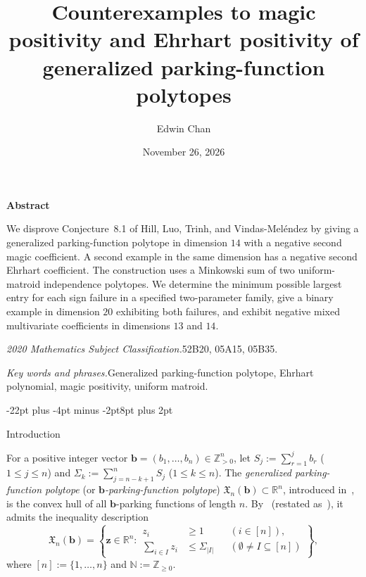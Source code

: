 \documentclass[11pt,letterpaper]{article}
\makeatletter
\renewcommand{\section}{\@startsection{section}{1}{\z@}%
  {-22pt plus -4pt minus -2pt}{8pt plus 2pt}%
  {\normalfont\fontsize{14}{17}\selectfont\bfseries\raggedright}}
\renewenvironment{abstract}{%
  \par\noindent\textbf{Abstract}\par\nobreak\vskip4pt
  \noindent\ignorespaces
}{\par}
\theoremstyle{result}
\theoremstyle{remark}
\newcommand{\NN}{\mathbb{N}}
\newcommand{\ZZ}{\mathbb{Z}}
\newcommand{\RR}{\mathbb{R}}
\newcommand{\X}{\mathfrak{X}}
\newcommand{\vb}{\mathbf{b}}
\makeatother
\begin{document}
\title{Counterexamples to magic positivity and Ehrhart positivity of generalized parking-function polytopes}
\author{Edwin Chan}
\date{November 26, 2026}

\maketitle

\begin{abstract}
We disprove Conjecture~8.1 of Hill, Luo, Trinh, and Vindas-Mel\'endez by giving a generalized parking-function polytope in dimension $14$ with a negative second magic coefficient. A second example in the same dimension has a negative second Ehrhart coefficient. The construction uses a Minkowski sum of two uniform-matroid independence polytopes. We determine the minimum possible largest entry for each sign failure in a specified two-parameter family, give a binary example in dimension $20$ exhibiting both failures, and exhibit negative mixed multivariate coefficients in dimensions $13$ and $14$.
\end{abstract}

\smallskip
{\small\noindent\textit{2020 Mathematics Subject Classification.}\enspace 52B20, 05A15, 05B35.
\par\noindent\textit{Key words and phrases.}\enspace Generalized parking-function polytope, Ehrhart polynomial, magic positivity, uniform matroid.\par}

\section{Introduction}
\label{sec:intro}

For a positive integer vector $\vb=(b_1,\dots,b_n)\in\ZZ_{>0}^n$, let $S_j:=\sum_{r=1}^j b_r$ ($1\le j\le n$) and $\Sigma_k:=\sum_{j=n-k+1}^n S_j$ ($1\le k\le n$). The \emph{generalized parking-function polytope} (or \emph{$\vb$-parking-function polytope}) $\X_n(\vb)\subset\RR^n$, introduced in~\cite{BBCDDDLMMNV,HLV24}, is the convex hull of all $\vb$-parking functions of length $n$. By~\cite[Theorem~2.3(c)]{BBCDDDLMMNV} (restated as~\cite[Theorem~2.2]{HLTV26}), it admits the inequality description
\begin{equation}\label{eq:ineq}
\X_n(\vb) =
\left\{\mathbf{z}\in\RR^n :
  \begin{aligned}
    z_i &\ge 1 && (i\in[n]),\\
    \sum_{i\in I} z_i &\le \Sigma_{|I|} && (\emptyset\ne I\subseteq[n])
  \end{aligned}
\right\},
\end{equation}
where $[n]:=\{1,\dots,n\}$ and $\NN:=\ZZ_{\ge 0}$.
\end{document}
